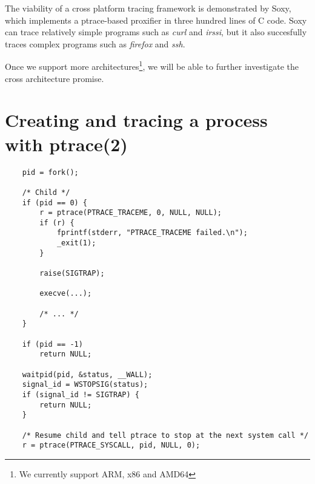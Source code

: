 \documentclass[a4paper, 10pt]{report}
\begin{document}
The viability of a cross platform tracing framework is demonstrated by Soxy,
which implements a ptrace-based proxifier in three hundred lines of C
code. Soxy can trace relatively simple programs such as \textit{curl} and
\textit{irssi}, but it also succesfully traces complex programs such as
\textit{firefox} and \textit{ssh}.

Once we support more architectures\footnote{We currently support ARM, x86 and
AMD64}, we will be able to further investigate the cross architecture promise.



\pagebreak

\appendix
\addappheadtotoc

\chapter{Creating and tracing a process with ptrace(2)}
\label{appendix:createtrace}

\begin{lstlisting}
    pid = fork();

    /* Child */
    if (pid == 0) {
        r = ptrace(PTRACE_TRACEME, 0, NULL, NULL);
        if (r) {
            fprintf(stderr, "PTRACE_TRACEME failed.\n");
            _exit(1);
        }

        raise(SIGTRAP);

        execve(...);

        /* ... */
    }

    if (pid == -1)
        return NULL;

    waitpid(pid, &status, __WALL);
    signal_id = WSTOPSIG(status);
    if (signal_id != SIGTRAP) {
        return NULL;
    }

    /* Resume child and tell ptrace to stop at the next system call */
    r = ptrace(PTRACE_SYSCALL, pid, NULL, 0);
\end{lstlisting}

% 
% 
% 
% 
% 
% 
\end{document}
